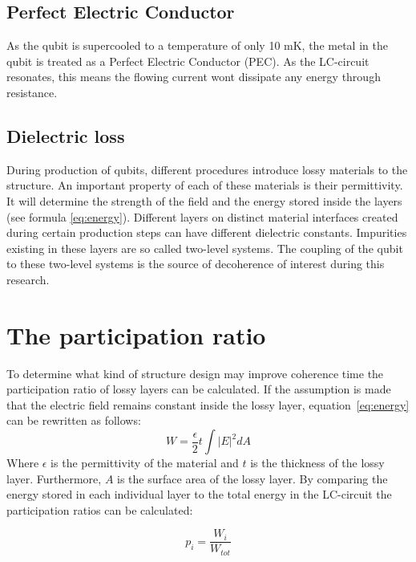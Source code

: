 \subsection{Perfect Electric Conductor}
As the qubit is supercooled to a temperature of only 10 mK, the metal in the qubit is treated as a Perfect Electric Conductor (PEC). As the LC-circuit resonates, this means the flowing current wont dissipate any energy through resistance. 
 
\subsection{Dielectric loss}
During production of qubits, different procedures introduce lossy materials to the structure. An important property of each of these materials is their permittivity. It will determine the strength of the field and the energy stored inside the layers (see formula \eqref{eq:energy}). Different layers on distinct material interfaces created during certain production steps can have different dielectric constants.   
Impurities existing in these layers are so called two-level systems. The coupling of the qubit to these two-level systems is the source of decoherence of interest during this research. 

\section{The participation ratio}
To determine what kind of structure design may improve coherence time the participation ratio of lossy layers can be calculated. If the assumption is made that the electric field remains constant inside the lossy layer, equation~\eqref{eq:energy} can be rewritten as follows:
\begin{equation}\label{eq:energy_layer}
W = \frac{\epsilon}{2}t\int{|E|}^{2}dA
\end{equation}
Where \(\epsilon\) is the permittivity of the material and \(t\) is the thickness of the lossy layer. Furthermore, \(A\) is the surface area of the lossy layer. By comparing the energy stored in each individual layer to the total energy in the LC-circuit the participation ratios can be calculated:

\begin{equation}\label{eq:PartRatio}
p_{\textit{i}}=\frac{W_{\textit{i}}}{W_{tot}}
\end{equation}


